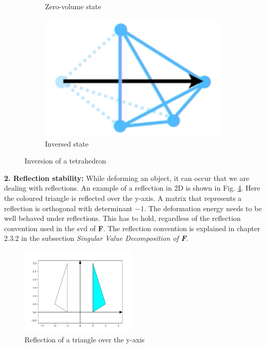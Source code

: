 \begin{figure}[!ht]
\begin{subfigure}{.3\textwidth}
  \caption{Zero-volume state}
  \label{fig:inversion_2}
\end{subfigure}
\begin{subfigure}{.3\textwidth}
  \centering
  \includegraphics[width=.8\linewidth]{resources/inversion_3}  
  \caption{Inversed state}
  \label{fig:inversion_3}
\end{subfigure}
\caption[Inversion of a tetrahedron]{Inversion of a tetrahedron {\cite{STREAM2018}}}
\label{fig:inversion}
\end{figure}


\textbf{2. Reflection stability:} While deforming an object, it can occur that we are dealing with reflections. An example of a reflection in 2D is shown in Fig. \ref{fig:reflection}. Here the coloured triangle is reflected over the y-axis. A matrix that represents a reflection is orthogonal with determinant $-1$. The deformation energy needs to be well behaved under reflections. This has to hold, regardless of the reflection convention used in the \acrshort{svd} of \textbf{F}. The reflection convention is explained in chapter 2.3.2 in the subsection \textit{Singular Value Decomposition of \textbf{F}}.

\begin{figure}[!htbp]
	\centering
	\includegraphics[width=0.5\textwidth]{resources/reflection_plot.png}
	\caption[Reflection of a triangle over the y-axis]{Reflection of a triangle over the y-axis}
	\label{fig:reflection}
\end{figure}

